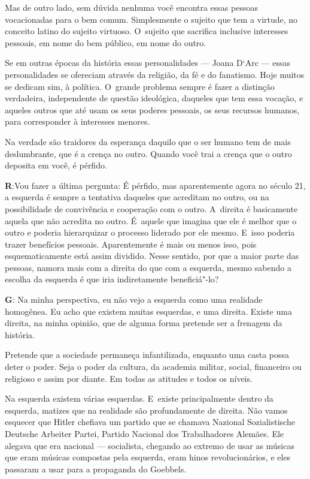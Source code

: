  

Mas de outro lado, sem dúvida nenhuma você encontra essas pessoas
vocacionadas para o bem comum. Simplesmente o sujeito que tem a
virtude, no conceito latino do sujeito virtuoso. O~sujeito que
sacrifica inclusive interesses pessoais, em nome do bem público, em nome
do outro.

 

Se em outras épocas da história essas personalidades --- Joana D`Arc ---
essas personalidades se ofereciam através da religião, da fé e do fanatismo. Hoje
muitos se dedicam sim, à política. O~grande problema sempre é fazer a
distinção verdadeira, independente de questão ideológica, daqueles que
tem essa vocação, e aqueles outros que até usam os seus poderes
pessoais, os seus recursos humanos, para corresponder à interesses
menores.

 

Na verdade são traidores da esperança daquilo que o ser humano tem de
mais deslumbrante, que é a crença no outro. Quando você trai a crença
que o outro deposita em você, é pérfido.

 

\textbf{R}:Vou fazer a última pergunta: É pérfido, mas aparentemente
agora no século 21, a esquerda é sempre a tentativa daqueles que
acreditam no outro, ou na possibilidade de convivência e cooperação com
o outro. A~direita é basicamente aquela que não acredita no outro. É~aquele que imagina que ele é melhor que o outro e poderia hierarquizar o
processo liderado por ele mesmo. E~isso poderia trazer benefícios
pessoais. Aparentemente é mais ou menos isso, pois esquematicamente está
assim dividido. Nesse sentido, por que a maior parte das pessoas, namora
mais com a direita do que com a esquerda, mesmo sabendo a escolha da
esquerda é que iria indiretamente beneficiá"-lo?

 

\textbf{G}: Na minha perspectiva, eu não vejo a esquerda como uma
realidade homogênea. Eu acho que existem muitas esquerdas, e uma
direita. Existe uma direita, na minha opinião, que de alguma forma
pretende ser a frenagem da história.

 

Pretende que a sociedade permaneça infantilizada, enquanto uma casta
possa deter o poder. Seja o poder da cultura, da academia militar,
social, financeiro ou religioso e assim por diante. Em todas as atitudes
e todos os níveis.

 

Na esquerda existem várias esquerdas. E~existe principalmente dentro da
esquerda, matizes que na realidade são profundamente de direita. Não
vamos esquecer que Hitler chefiava um partido que se chamava Nazional
Sozialistische Deutsche Arbeiter Partei, Partido Nacional dos
Trabalhadores Alemães. Ele alegava que era nacional --- socialista,
chegando ao extremo de usar as músicas que eram músicas compostas pela
esquerda, eram hinos revolucionários, e eles passaram a usar para a
propaganda do Goebbels. 

